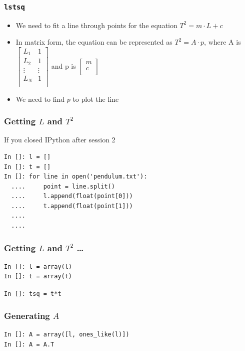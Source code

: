 \documentclass[14pt,compress]{beamer}
\newcommand{\typ}[1]{\lstinline{#1}}
\begin{document}
\begin{frame}[fragile]
\frametitle{\typ{lstsq}}
\begin{itemize}
\item We need to fit a line through points for the equation $T^2 = m \cdot L+c$
\item In matrix form, the equation can be represented as $T^2 = A \cdot p$, where A is   
  $\begin{bmatrix}
  L_1 & 1 \\
  L_2 & 1 \\
  \vdots & \vdots\\
  L_N & 1 \\
  \end{bmatrix}$
  and p is 
  $\begin{bmatrix}
  m\\
  c\\
  \end{bmatrix}$
\item We need to find $p$ to plot the line
\end{itemize}
\end{frame}

\begin{frame}[fragile]
\frametitle{Getting $L$ and $T^2$}
If you \alert{closed} IPython after session 2
\begin{lstlisting}
In []: l = []
In []: t = []
In []: for line in open('pendulum.txt'):
  ....     point = line.split()
  ....     l.append(float(point[0]))
  ....     t.append(float(point[1]))
  ....
  ....
\end{lstlisting}
\end{frame}

\begin{frame}[fragile]
\frametitle{Getting $L$ and $T^2$ \dots}
\begin{lstlisting}
In []: l = array(l)
In []: t = array(t)
\end{lstlisting}
\alert{\typ{In []: tsq = t*t}}
\end{frame}
 
\begin{frame}[fragile]
\frametitle{Generating $A$}
\begin{lstlisting}
In []: A = array([l, ones_like(l)])
In []: A = A.T
\end{lstlisting}
\end{frame}
\end{document}
